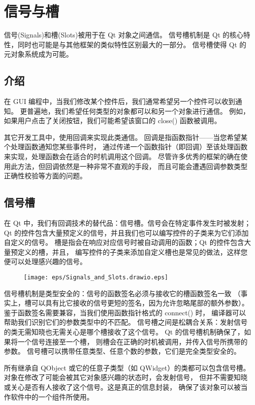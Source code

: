 \chapter{信号与槽}

信号(Signals)和槽(Slots)被用于在 Qt 对象之间通信。
信号槽机制是 Qt 的核心特性，同时也可能是与其他框架的类似特性区别最大的一部分。
信号槽使得 Qt 的元对象系统成为可能。

\section{介绍}

在 GUI 编程中，当我们修改某个控件后，我们通常希望另一个控件可以收到通知。
更普遍地，我们希望任何类型的对象都可以和另一个对象进行通信。
例如，如果用户点击了关闭按钮，我们可能希望该窗口的 close() 函数被调用。

其它开发工具中，使用回调来实现此类通信。
回调是指函数指针——当您希望某个处理函数通知您某些事件时，
通过传递一个函数指针（即回调）至该处理函数来实现，处理函数会在适合的时机调用这个回调。
尽管许多优秀的框架的确在使用此方法，但回调依然是一种非常不直观的手段，
而且可能会遭遇回调参数类型正确性校验等方面的问题。

\section{信号槽}

在 Qt 中，我们有回调技术的替代品：信号槽。信号会在特定事件发生时被发射；
Qt 的控件包含大量预定义的信号，并且我们也可以编写控件的子类来为它们添加自定义的信号。
槽是指会在响应对应信号时被自动调用的函数；Qt 的控件包含大量预定义的槽，并且，
编写控件的子类来添加自定义槽也是常见的做法，这样您便可以处理感兴趣的信号。

\begin{figure}[hbt!]  
\centering
\texttt{[image: eps/Signals\_and\_Slots.drawio.eps]}
\end{figure}

信号槽机制是类型安全的：信号的函数签名必须与接收它的槽函数签名一致
（事实上，槽可以具有比它接收的信号更短的签名，因为允许忽略尾部的额外参数）。
鉴于函数签名需要兼容，当我们使用函数指针格式的 connect() 时，
编译器可以帮助我们识别它们的参数类型中的不匹配。
信号槽之间是松耦合关系：发射信号的类无需知晓也无需关心是哪个槽接收了这个信号。
Qt 的信号槽机制确保了，如果将一个信号连接至一个槽，
则槽会在正确的时机被调用，并传入信号所携带的参数。
信号槽可以携带任意类型、任意个数的参数，它们是完全类型安全的。

所有继承自 QObject 或它的任意子类型（如 QWidget）的类都可以包含信号槽。
对象在修改了可能会被其它对象感兴趣的状态时，会发射信号，
但并不需要知晓或关心是否有人接收了这个信号。这是真正的信息封装，
确保了该对象可以被当作软件中的一个组件所使用。

